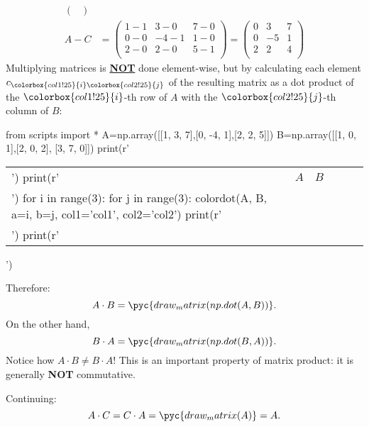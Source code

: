 \begin{enumerate}
\begin{enumerate}
{\begin{answer}
\begin{align*}
\begin{pmatrix}
											\end{pmatrix}\\
											A-C &=
											\begin{pmatrix}
												1-1 & 3-0  & 7-0\\
												0-0 & -4-1 & 1-0\\
												2-0 & 2-0  & 5-1\\
											\end{pmatrix}
											=
											\begin{pmatrix}
												0 & 3  & 7\\
												0 & -5 & 1\\
												2 & 2  & 4\\
											\end{pmatrix}
										\end{align*}
										Multiplying matrices is \underline{\textbf{NOT}} done element-wise, but by calculating each element $c_{\colorbox{col1!25}{i}\colorbox{col2!25}{j}}$ of the resulting matrix as a dot product of the $\colorbox{col1!25}{i}$-th row of $A$ with the $\colorbox{col2!25}{j}$-th column of $B$:\\
						  \begin{pycode}
from scripts import *
A=np.array([[1, 3, 7],[0, -4, 1],[2, 2, 5]])
B=np.array([[1, 0, 1],[2, 0, 2], [3, 7, 0]])
print(r'\begin{tabular}{l c c c c r}')
print(r'& $A$ & $B$ &&&\\')
for i in range(3):
		for j in range(3):
				colordot(A, B, a=i, b=j, col1='col1', col2='col2')
		print(r'\\')
print(r'\end{tabular}')
						  \end{pycode}
										Therefore:
										\begin{equation*}
											A\cdot B = \pyc{draw_matrix(np.dot(A, B))}.
										\end{equation*}
										On the other hand,
										\begin{equation*}
											B\cdot A = \pyc{draw_matrix(np.dot(B, A))}.
										\end{equation*}
										Notice how $A\cdot B \neq B\cdot A$! This is an important property of matrix product: it is generally \textbf{NOT} commutative.

										Continuing:
										\begin{equation*}
											A\cdot C = C\cdot A = \pyc{draw_matrix(A)} = A.
										\end{equation*}


\end{answer}}
\end{enumerate}
\end{enumerate}

